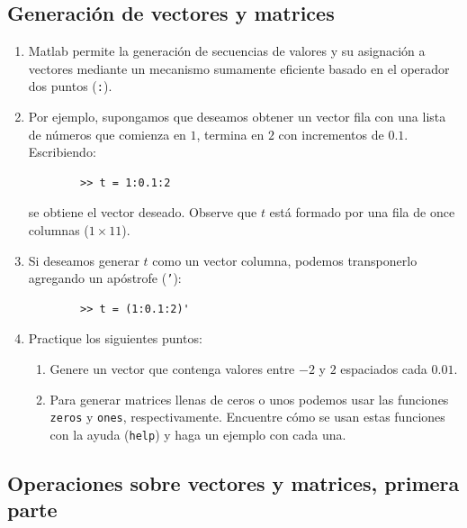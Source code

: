\documentclass[11pt,a4paper,openany]{book}
\begin{document}
\subsection{Generación de vectores y matrices}

\begin{enumerate}
	\item Matlab permite la generación de secuencias de valores y su asignación a vectores mediante un mecanismo sumamente eficiente basado en el operador dos puntos (\texttt{:}).
	\item Por ejemplo, supongamos que deseamos obtener un vector fila con una lista de números que comienza en $1$, termina en $2$ con incrementos de $0.1$. Escribiendo:
	\begin{verbatim}
		>> t = 1:0.1:2
	\end{verbatim}
	se obtiene el vector deseado. Observe que $t$ está formado por una fila de once columnas ($1 \times 11$).
	
	\item Si deseamos generar $t$ como un vector columna, podemos transponerlo agregando un apóstrofe (\texttt{'}):
	\begin{verbatim}
		>> t = (1:0.1:2)'
	\end{verbatim}
	
	\item Practique los siguientes puntos:
	\begin{enumerate}
		\item Genere un vector que contenga valores entre $-2$ y $2$ espaciados cada $0.01$.
		\item Para generar matrices llenas de ceros o unos podemos usar las funciones \texttt{zeros} y \texttt{ones}, respectivamente. Encuentre cómo se usan estas funciones con la ayuda (\texttt{help}) y haga un ejemplo con cada una.
	\end{enumerate}
\end{enumerate}

\subsection{Operaciones sobre vectores y matrices, primera parte}
\end{document}
